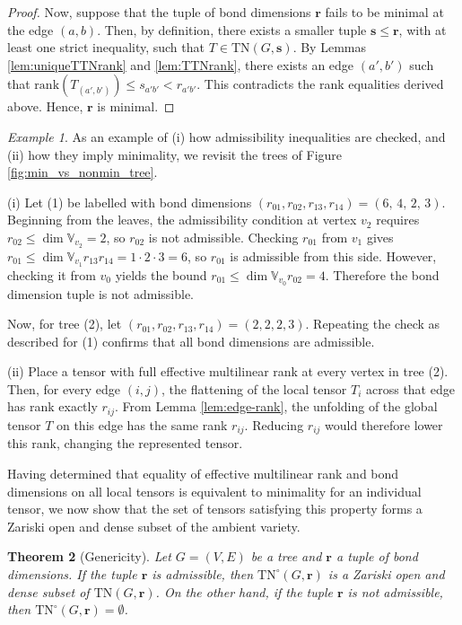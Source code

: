 \documentclass{amsart}
\theoremstyle{plain}
\newtheorem{theorem}{Theorem}[section]
\theoremstyle{definition}
\theoremstyle{remark}
\newtheorem{example}[theorem]{Example}
\begin{document}
\begin{proof}[Proof]
Now, suppose that the tuple of bond dimensions $\mathbf r$ fails to be minimal at the edge $(a,b)$. Then, by definition, there exists a smaller tuple $\mathbf s \le \mathbf r$, with at least one strict inequality, such that $ T\in\mathrm{TN}(G, \mathbf s)$. By Lemmas \ref{lem:uniqueTTNrank} and \ref{lem:TTNrank}, there exists an edge $(a', b')$ such that $\mathrm{rank}(T_{(a',b')})\le s_{a'b'}< r_{a'b'}$. This contradicts the rank equalities derived above. Hence, $\mathbf r$ is minimal. 
\end{proof}

\begin{example}
    As an example of (i) how admissibility inequalities are checked, and (ii) how they imply minimality, we revisit the trees of Figure \ref{fig:min_vs_nonmin_tree}.
    
    (i) Let (1) be labelled with bond dimensions $(r_{01}, r_{02}, r_{13}, r_{14})=(6,\, 4,\, 2,\, 3)$. Beginning from the leaves, the admissibility condition at vertex $v_2$ requires $r_{02}\le \dim \mathbb V_{v_2}=2$, so $r_{02}$ is not admissible. Checking $r_{01}$ from $v_1$ gives $r_{01}\le \dim\mathbb V_{v_1} r_{13} r_{14}=1\cdot 2\cdot 3=6$, so $r_{01}$ is admissible from this side. However, checking it from $v_0$ yields the bound $r_{01}\le \dim\mathbb V_{v_0}r_{02}=4$. Therefore the bond dimension tuple is not admissible.
    
    Now, for tree (2), let $(r_{01}, r_{02}, r_{13}, r_{14})=(2, 2, 2, 3)$. Repeating the check as described for (1) confirms that all bond dimensions are admissible.
    
    (ii) Place a tensor with full effective multilinear rank at every vertex in tree (2). Then, for every edge $(i,j)$, the flattening of the local tensor $T_i$ across that edge has rank exactly $r_{ij}$. From Lemma \ref{lem:edge-rank}, the unfolding of the global tensor $T$ on this edge has the same rank $r_{ij}$. Reducing $r_{ij}$ would therefore lower this rank, changing the represented tensor.
\end{example}

Having determined that equality of effective multilinear rank and bond dimensions on all local tensors is equivalent to minimality for an individual tensor, we now show that the set of tensors satisfying this property forms a Zariski open and dense subset of the ambient variety.

\begin{theorem}[Genericity]\label{theorem:genericity}
Let $G=(V,E)$ be a tree and $\mathbf r$ a tuple of bond dimensions. If the tuple $\mathbf r$ is admissible, then $\mathrm{TN}^\circ(G, \mathbf{r})$ is a Zariski open and dense subset of $\mathrm{TN}(G, \mathbf r)$. On the other hand, if the tuple $\mathbf r$ is not admissible, then $\mathrm{TN}^\circ(G, \mathbf r)=\emptyset$.
\end{theorem}
\end{document}
